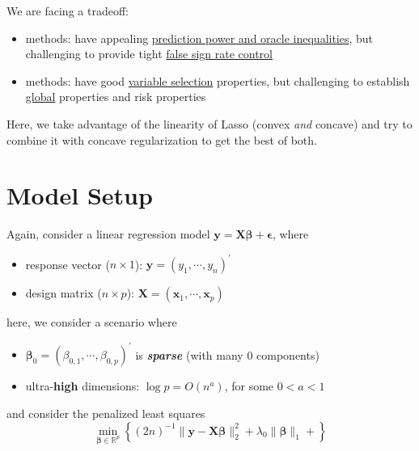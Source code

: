 \documentclass[twoside]{article}
\begin{document}

We are facing a tradeoff:
\begin{itemize}
    \item {} methods: have appealing \underline{prediction power and oracle inequalities}, but challenging to provide tight \underline{false sign rate control}
    \item {} methods: have good \underline{variable selection} properties, but challenging to establish \underline{global} properties and risk properties
\end{itemize}

Here, we take advantage of the linearity of Lasso (convex \textit{and} concave) and try to combine it with concave regularization to get the best of both.

\section{Model Setup}
Again, consider a linear regression model $\mathbf{y}=\mathbf{X}\boldsymbol{\beta}+\boldsymbol{\epsilon}$, where 
\begin{itemize}
    \item response vector ($n\times 1$): $\mathbf{y} = (y_1,\cdots,y_n)^{\prime}$
    \item design matrix ($n\times p$): $\mathbf{X} = (\mathbf{x}_1,\cdots,\mathbf{x}_p)$
\end{itemize}
here, we consider a scenario where
\begin{itemize}
    \item $\boldsymbol{\beta}_0 = (\beta_{0,1},\cdots,\beta_{0,p})^{\prime}$ is \textit{\textbf{sparse}} (with many 0 components)
    \item ultra-\textbf{high} dimensions: $\log p=O(n^a)$, for some $0<a<1$
\end{itemize}
and consider the penalized least squares 
\begin{equation}
    \min_{\boldsymbol{\beta}\in\mathbb{R}^p}\left\{ (2n)^{-1}\lVert \mathbf{y}-\mathbf{X}\boldsymbol{\beta} \rVert ^2_2 + \lambda_0 \lVert \boldsymbol{\beta} \rVert _1 +  \right\}
\end{equation}

%
%
\end{document}
